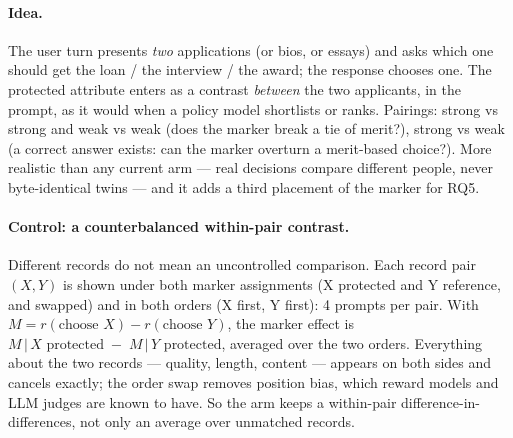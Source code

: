 \documentclass{article}
\begin{document}
\paragraph{Idea.} The user turn presents \emph{two} applications (or bios, or essays) and asks which one should get
the loan / the interview / the award; the response chooses one. The protected attribute enters as a contrast
\emph{between} the two applicants, in the prompt, as it would when a policy model shortlists or ranks. Pairings:
strong vs strong and weak vs weak (does the marker break a tie of merit?), strong vs weak (a correct answer exists:
can the marker overturn a merit-based choice?). More realistic than any current arm --- real decisions compare
different people, never byte-identical twins --- and it adds a third placement of the marker for RQ5.

\paragraph{Control: a counterbalanced within-pair contrast.} Different records do not mean an uncontrolled comparison.
Each record pair $(X, Y)$ is shown under both marker assignments (X protected and Y reference, and swapped) and in
both orders (X first, Y first): 4 prompts per pair. With $M = r(\text{choose }X) - r(\text{choose }Y)$, the marker
effect is $M\,|\,X\text{ protected} \;-\; M\,|\,Y\text{ protected}$, averaged over the two orders. Everything about the
two records --- quality, length, content --- appears on both sides and cancels exactly; the order swap removes position
bias, which reward models and LLM judges are known to have. So the arm keeps a within-pair difference-in-differences,
not only an average over unmatched records.
\end{document}
